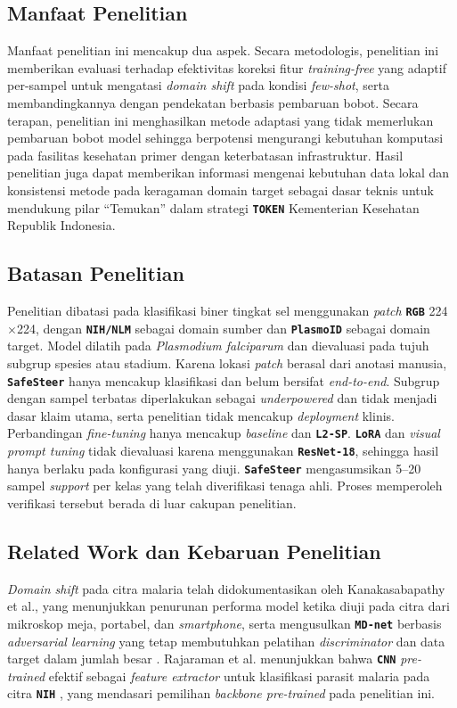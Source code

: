 \documentclass[conference]{IEEEtran}
\newcommand{\nama}[1]{\textbf{\texttt{#1}}}
\begin{document}
\subsection{Manfaat Penelitian}
Manfaat penelitian ini mencakup dua aspek. Secara metodologis, penelitian ini memberikan evaluasi terhadap efektivitas koreksi fitur \textit{training-free} yang adaptif per-sampel untuk mengatasi \textit{domain shift} pada kondisi \textit{few-shot}, serta membandingkannya dengan pendekatan berbasis pembaruan bobot. Secara terapan, penelitian ini menghasilkan metode adaptasi yang tidak memerlukan pembaruan bobot model sehingga berpotensi mengurangi kebutuhan komputasi pada fasilitas kesehatan primer dengan keterbatasan infrastruktur. Hasil penelitian juga dapat memberikan informasi mengenai kebutuhan data lokal dan konsistensi metode pada keragaman domain target sebagai dasar teknis untuk mendukung pilar ``Temukan'' dalam strategi \nama{TOKEN} Kementerian Kesehatan Republik Indonesia.

\subsection{Batasan Penelitian}
Penelitian dibatasi pada klasifikasi biner tingkat sel menggunakan \textit{patch} \nama{RGB} 224$\times$224, dengan \nama{NIH/NLM} sebagai domain sumber dan \nama{PlasmoID} sebagai domain target. Model dilatih pada \textit{Plasmodium falciparum} dan dievaluasi pada tujuh subgrup spesies atau stadium. Karena lokasi \textit{patch} berasal dari anotasi manusia, \nama{SafeSteer} hanya mencakup klasifikasi dan belum bersifat \textit{end-to-end}. Subgrup dengan sampel terbatas diperlakukan sebagai \textit{underpowered} dan tidak menjadi dasar klaim utama, serta penelitian tidak mencakup \textit{deployment} klinis. Perbandingan \textit{fine-tuning} hanya mencakup \textit{baseline} dan \textbf{\nama{L2-SP}}. \nama{LoRA} dan \textit{visual prompt tuning} tidak dievaluasi karena menggunakan \nama{ResNet-18}, sehingga hasil hanya berlaku pada konfigurasi yang diuji. \nama{SafeSteer} mengasumsikan 5--20 sampel \textit{support} per kelas yang telah diverifikasi tenaga ahli. Proses memperoleh verifikasi tersebut berada di luar cakupan penelitian.

\subsection{Related Work dan Kebaruan Penelitian}
\textit{Domain shift} pada citra malaria telah didokumentasikan oleh Kanakasabapathy et al., yang menunjukkan penurunan performa model ketika diuji pada citra dari mikroskop meja, portabel, dan \textit{smartphone}, serta mengusulkan \nama{MD-net} berbasis \textit{adversarial learning} yang tetap membutuhkan pelatihan \textit{discriminator} dan data target dalam jumlah besar \cite{b2}. Rajaraman et al. menunjukkan bahwa \nama{CNN} \textit{pre-trained} efektif sebagai \textit{feature extractor} untuk klasifikasi parasit malaria pada citra \nama{NIH} \cite{b15}, yang mendasari pemilihan \textit{backbone pre-trained} pada penelitian ini.
\end{document}

